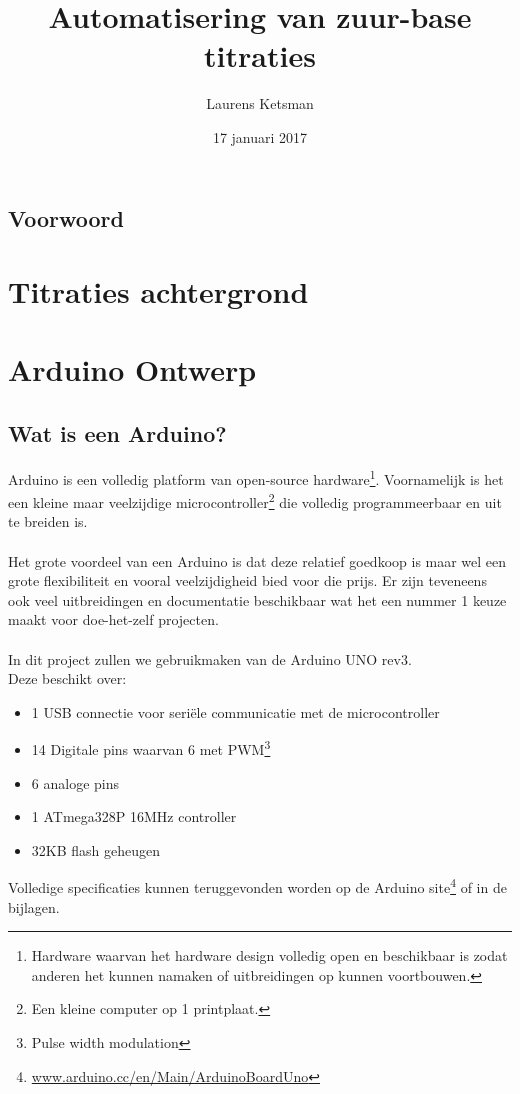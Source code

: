 \documentclass[10pt,twoside]{report}
\author{Laurens Ketsman}
\title{Automatisering van zuur-base titraties}
\date{17 januari 2017}
\newcommand\blankpage{%
    \null
    \thispagestyle{empty}%
    \addtocounter{page}{-1}%
    \newpage}
\begin{document}
\clearpage\maketitle
\thispagestyle{empty}

\blankpage

\tableofcontents
\thispagestyle{empty}

\newpage
\section*{Voorwoord}
\thispagestyle{empty}


\fancyfoot{}
\fancyhead[RO]{\leftmark\ \rule[-0.25em]{0.14em}{1.3em}\ \thepage}
\fancyhead[LE]{\thepage\ \rule[-0.25em]{0.14em}{1.3em}\ \rightmark}

\newpage
\chapter{Titraties achtergrond}

\chapter{Arduino Ontwerp}
\section{Wat is een Arduino?}
Arduino is een volledig platform van open-source hardware\footnote{Hardware waarvan het hardware design volledig open en beschikbaar is zodat anderen het kunnen namaken of uitbreidingen op kunnen voortbouwen.}. Voornamelijk is het een kleine maar veelzijdige microcontroller\footnote{Een kleine computer op 1 printplaat.} die volledig programmeerbaar en uit te breiden is.
\\\\
Het grote voordeel van een Arduino is dat deze relatief goedkoop is maar wel een grote flexibiliteit en vooral veelzijdigheid bied voor die prijs. Er zijn teveneens ook veel uitbreidingen en documentatie beschikbaar wat het een nummer 1 keuze maakt voor doe-het-zelf projecten.
\\\\
In dit project zullen we gebruikmaken van de Arduino UNO rev3.\\
Deze beschikt over:
\begin{itemize}
    \item 1 USB connectie voor seriële communicatie met de microcontroller
    \item 14 Digitale pins waarvan 6 met PWM\footnote{Pulse width modulation}
    \item 6 analoge pins
    \item 1 ATmega328P 16MHz controller
    \item 32KB flash geheugen
\end{itemize}
Volledige specificaties kunnen teruggevonden worden op de Arduino site\footnote{\url{www.arduino.cc/en/Main/ArduinoBoardUno}} of in de bijlagen.
\end{document}

